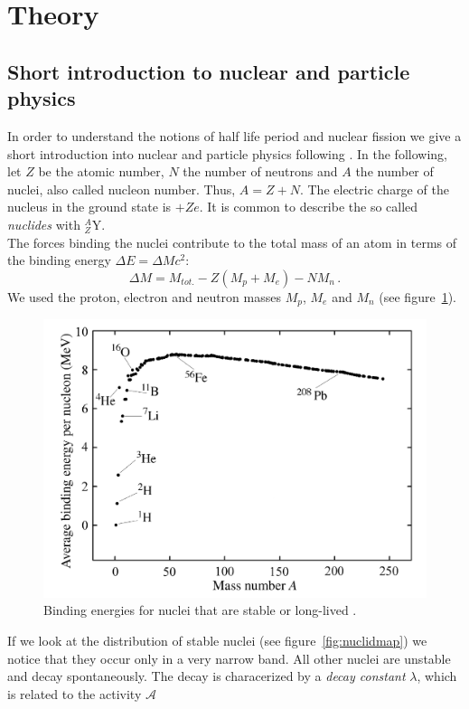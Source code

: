 \section{Theory}
\subsection{Short introduction to nuclear and particle physics}
In order to understand the notions of half life period and nuclear fission we
give a short introduction into nuclear and particle physics following \cite{bettini2008introduction}.
In the following, let $Z$ be the atomic number, $N$ the number of neutrons and $A$ the number of nuclei, also
called nucleon number. Thus, $A = Z + N$. The electric charge of the nucleus in the ground state is $+Z e$.
It is common to describe the so called \emph{nuclides} with $_{Z}^{A}\textrm{Y}$.\\
The forces binding the nuclei contribute to the total mass of an atom in terms of the 
binding energy $\Delta E = \Delta M c^2$:
\begin{equation}
\Delta M = M_{tot.} - Z(M_p + M_e) - N M_n \, .
\end{equation}
We used the proton, electron and neutron masses $M_p$, $M_e$ and $M_n$ 
(see figure~\ref{fig:bindingenergy}).
\begin{figure}[htpb]
    \centering
    \includegraphics[width=0.8\linewidth]{figures/bindingenergy}
    \caption{Binding energies for nuclei that are stable or long-lived \cite{Hooshyar}.}
    \label{fig:bindingenergy}
\end{figure}
If we look at the distribution of stable nuclei (see figure~\ref{fig:nuclidmap}) we notice
that they occur only in a very narrow band. All other nuclei are unstable and decay spontaneously.
The decay is characerized by a \emph{decay constant} $\lambda$, which is related to the activity $\mathcal{A}$
